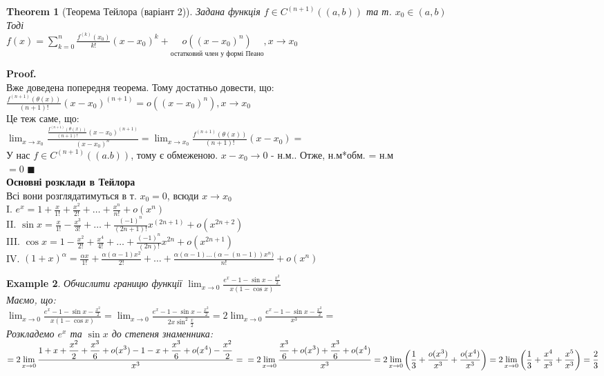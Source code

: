 \documentclass[a4paper, 14pt]{extarticle}
\def\huge{\displaystyle}
\def\bigline{\vspace{5mm}\\}
\theoremstyle{theoremdd}
\newtheorem{theorem}{Theorem}[subsection]
\theoremstyle{theoremdd}
\theoremstyle{theoremdd}
\theoremstyle{theoremdd}
\newtheorem{example}[theorem]{Example}
\theoremstyle{theoremdd}
\theoremstyle{theoremdd}
\theoremstyle{theoremdd}
\theoremstyle{theoremdd}
\newenvironment{pf}{\vspace*{-3mm} \textbf{Proof. \\}}{$\blacksquare$}
\begin{document}
\begin{theorem}[Теорема Тейлора (варіант 2)]
Задана функція $f \in C^{(n+1)}((a,b))$ та т. $x_0 \in (a,b)$\\
Тоді\\
$f(x) = \huge \sum_{k=0}^n \frac{f^{(k)}(x_0)}{k!}(x-x_0)^k + \underset{\textrm{остатковий член у формі Пеано}}{o((x-x_0)^n)}, x \to x_0$
\end{theorem}
\begin{pf}
Вже доведена попередня теорема. Тому достатньо довести, що:\\
$\huge \frac{f^{(n+1)}(\theta(x))}{(n+1)!}(x-x_0)^{(n+1)} = o((x-x_0)^n), x \to x_0$\\
Це теж саме, що:\\
$\huge \lim_{x \to x_0} \frac{\displaystyle \frac{f^{(n+1)}(\theta(x))}{(n+1)!}(x-x_0)^{(n+1)}}{(x-x_0)^n} = \lim_{x \to x_0} \frac{f^{(n+1)}(\theta(x))}{(n+1)!}(x-x_0)=$\\
У нас $f \in C^{(n+1)}((a.b))$, тому є обмеженою. $x-x_0 \to 0$ - н.м.. Отже, н.м*обм. = н.м\\
$= 0$
\end{pf}
\\

\textbf{Основні розклади в Тейлора}\\
Всі вони розглядатимуться в т. $x_0 = 0$, всюди $x \to x_0$\\
I. $e^x \huge = 1 + \frac{x}{1!} + \frac{x^2}{2!} + \dots + \frac{x^n}{n!} + o(x^n)$\\
II. $\sin x \huge = \frac{x}{1!} - \frac{x^3}{3!} + \dots + \frac{(-1)^n}{(2n+1)!}x^{(2n+1)} + o(x^{2n+2})$\\
III. $\cos x \huge = 1 - \frac{x^2}{2!} + \frac{x^4}{4!} + \dots + \frac{(-1)^n}{(2n)!}x^{2n} + o(x^{2n+1})$\\
IV. $(1+x)^{\alpha} \huge = \frac{\alpha x}{1!} + \frac{\alpha (\alpha-1) x^2}{2!} + \dots + \frac{\alpha (\alpha-1)\dots(\alpha-(n-1)) x^n)}{n!} + o(x^n)$
\bigline
\begin{example}
Обчислити границю функції $\huge \lim_{x \to 0} \frac{\huge e^x-1-\sin x - \frac{x^2}{2}}{x(1-\cos x)}$\\
Маємо, що:\\
$\huge \lim_{x \to 0} \frac{\huge e^x-1-\sin x - \frac{x^2}{2}}{x(1-\cos x)} = \lim_{x \to 0} \frac{\huge e^x - 1 - \sin x - \frac{x^2}{2}}{2x \sin^2 \frac{x}{2}} = 2\lim_{x \to 0} \frac{\huge e^x - 1 - \sin x - \frac{x^2}{2}}{x^3} = $\\
Розкладемо $e^x$ та $\sin x$ до степеня знаменника:\\
$= \huge 2\lim_{x \to 0} \frac{\displaystyle 1 + x + \frac{x^2}{2} + \frac{x^3}{6} + o(x^3) - 1 - x + \frac{x^3}{6} + o(x^4) - \frac{x^2}{2}}{x^3} = \\ = 2\lim_{x \to 0} \frac{\displaystyle \frac{x^3}{6} + o(x^3) + \frac{x^3}{6} + o(x^4)}{x^3} = 2 \lim_{x \to 0} \left(\frac{1}{3} + \frac{o(x^3)}{x^3} + \frac{o(x^4)}{x^3} \right) = \\ 2 \lim_{x \to 0} \left(\frac{1}{3} + \frac{x^4}{x^3} + \frac{x^5}{x^3} \right) = \frac{2}{3}$
\end{example}
\end{document}
